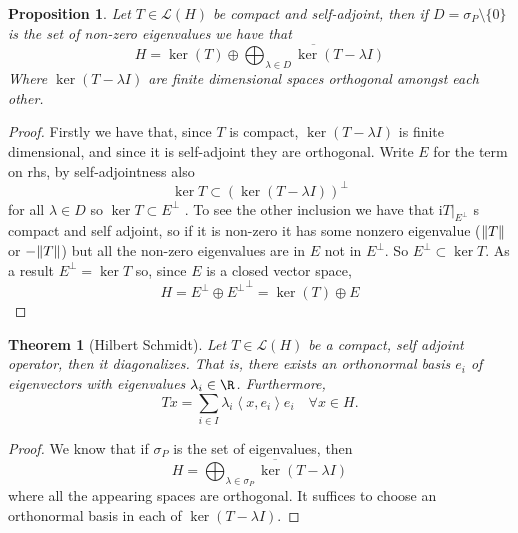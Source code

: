 \documentclass[12pt]{article}
\newtheorem{theorem}{Theorem}
\newtheorem{proposition}{Proposition}
\newcommand{\br}[1]{\left\langle#1\right\rangle}
\begin{document}
\begin{proposition}
    Let $T\in\mathcal{L}(H)$ be compact and self-adjoint, then if $D=\sigma_P\setminus\{0\}$ is the set of non-zero eigenvalues we have that
    \begin{equation*}
        H=\operatorname{ker}(T) \oplus \overline{\bigoplus_{\lambda \in D} \operatorname{ker}(T-\lambda I)}
    \end{equation*}
    Where $\operatorname{ker}(T-\lambda I)$ are finite dimensional spaces orthogonal amongst each other.
\end{proposition}
\begin{proof}
    Firstly we have that, since $T$ is compact, $\ker(T-\lambda I)$ is finite dimensional, and since it is self-adjoint they are orthogonal. Write $E$ for the term on rhs, by self-adjointness also
    \begin{equation*}
        \ker{T}\subset (\ker(T-\lambda I))^\perp
    \end{equation*}
    for all $\lambda\in D$ so $\ker{T}\subset E^\perp$  . To see the other inclusion we have that i$T|_{E^\perp}$ s compact and self adjoint, so if it is non-zero it has some nonzero eigenvalue ($\norm{T}$ or $-\norm{T}$) but all the non-zero eigenvalues are in $E$ not in $E^\perp$. So $E^\perp\subset\ker{T}$. As a result $E^\perp=\ker{T}$ so, since $E$ is a closed vector space,
    \begin{equation*}
        H=E^\perp\oplus {E^\perp}^\perp=\ker(T)\oplus E
    \end{equation*}
\end{proof}
\begin{theorem}[Hilbert Schmidt]\label{Hilber-Schmidt}
    Let $T\in\mathcal{L}(H)$ be a compact, self adjoint operator, then it diagonalizes. That is, there exists an orthonormal basis $e_i$ of eigenvectors with eigenvalues $\lambda_i\in\R$. Furthermore,
    \begin{equation*}
        Tx=\sum_{i\in I} \lambda_i\br{x,e_i}e_i\quad\forall x\in H.
    \end{equation*}
\end{theorem}
\begin{proof}
    We know that if $\sigma_P$ is the set of eigenvalues, then
    \begin{equation*}
        H= \overline{\bigoplus_{\lambda \in \sigma_P} \operatorname{ker}(T-\lambda I)}
    \end{equation*}
    where all the appearing spaces are orthogonal. It suffices to choose an orthonormal basis in each of $\operatorname{ker}(T-\lambda I)$.
\end{proof}
\end{document}
